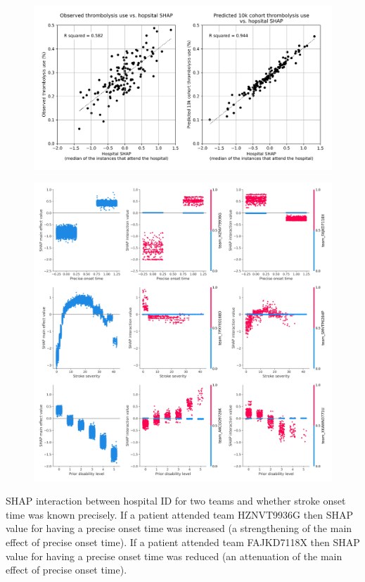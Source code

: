 \begin{figure}
\centering
\includegraphics[width=1\textwidth]{./images/99_twin_correlation_scatter}
\caption{}
\end{figure}



\begin{figure}
\centering
\includegraphics[width=1.0\textwidth]{./images/12aa_xgb_10_features_3_features_interaction_example_with_main_effect}
\caption{}
\end{figure}

SHAP interaction between hospital ID for two teams and whether stroke onset time was known precisely. If a patient attended team HZNVT9936G then SHAP value for having a precise onset time was increased (a strengthening of the main effect of precise onset time). If a patient attended team FAJKD7118X then SHAP value for having a precise onset time was reduced (an attenuation of the main effect of precise onset time).


